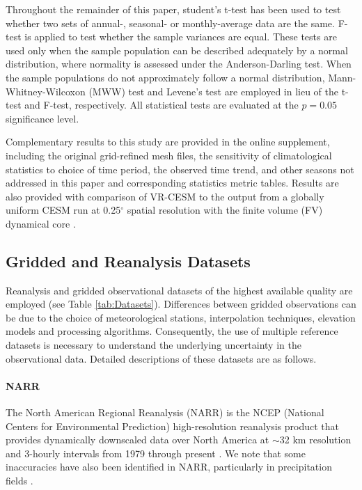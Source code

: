 \documentclass[draft,ms]{agutex}   %
\begin{document}
\begin{article}
Throughout the remainder of this paper, student's t-test has been used to test whether two sets of annual-, seasonal- or monthly-average data are the same. F-test is applied to test whether the sample variances are equal. These tests are used only when the sample population can be described adequately by a normal distribution, where normality is assessed under the Anderson-Darling test. When the sample populations do not approximately follow a normal distribution, Mann-Whitney-Wilcoxon (MWW) test and Levene's test are employed in lieu of the t-test and F-test, respectively. All statistical tests are evaluated at the $p = 0.05$ significance level.

Complementary results to this study are provided in the online supplement, including the original grid-refined mesh files, the sensitivity of climatological statistics to choice of time period, the observed time trend, and other seasons not addressed in this paper and corresponding statistics metric tables. Results are also provided with comparison of VR-CESM to the output from a globally uniform CESM run at 0.25$^\circ$ spatial resolution with the finite volume (FV) dynamical core \citep{wehner2014effect}.


\subsection{Gridded and Reanalysis Datasets}

Reanalysis and gridded observational datasets of the highest available quality are employed (see Table \ref{tab:Datasets}). Differences between gridded observations can be due to the choice of meteorological stations, interpolation techniques, elevation models and processing algorithms.  Consequently, the use of multiple reference datasets is necessary to understand the underlying uncertainty in the observational data.  Detailed descriptions of these datasets are as follows.

\paragraph{NARR}  The North American Regional Reanalysis (NARR) is the NCEP (National Centers for Environmental Prediction) high-resolution reanalysis product that provides dynamically downscaled data over North America at $\sim$32 km resolution and 3-hourly intervals from 1979 through present \citep{mesinger2006north}. We note that some inaccuracies have also been identified in NARR, particularly in precipitation fields \citep{bukovsky2007brief}.


\end{article}
\end{document}
